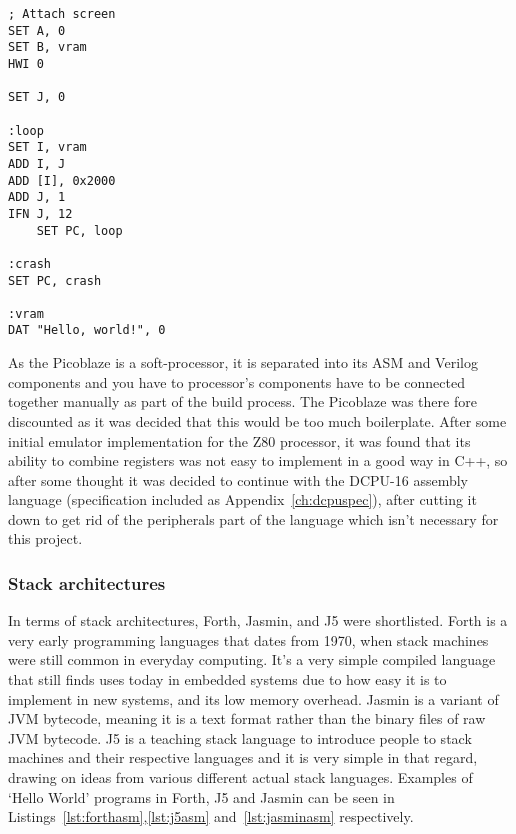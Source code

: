 \noindent\begin{minipage}{\linewidth} %
\begin{lstlisting}[caption={DCPU-16 ASM}, label={lst:dcpuasm}]
; Attach screen
SET A, 0
SET B, vram
HWI 0

SET J, 0

:loop
SET I, vram
ADD I, J
ADD [I], 0x2000
ADD J, 1
IFN J, 12
    SET PC, loop

:crash
SET PC, crash

:vram
DAT "Hello, world!", 0
\end{lstlisting}%
\end{minipage}

As the Picoblaze is a soft-processor, it is separated into its ASM and Verilog
components and you have to processor's components have to be connected together
manually as part of the build process. The Picoblaze was there fore discounted
as it was decided that this would be too much boilerplate.
After some initial emulator implementation for the
Z80 processor, it was found that its ability to combine registers was not easy
to implement in a good way in C++, so after some thought it was decided to
continue with the DCPU-16 assembly language (specification included as
Appendix~\ref{ch:dcpuspec}), after cutting it down to get rid of
the peripherals part of the language which isn't necessary for this project.

\subsubsection{Stack architectures}

In terms of stack architectures, Forth, Jasmin, and J5 were shortlisted. Forth
is a very early programming languages that dates from 1970, when stack machines
were still common in everyday computing. It's a very simple compiled language
that still finds uses today in embedded systems due to how easy it is to
implement in new systems, and its low memory overhead. Jasmin is a variant of
JVM bytecode, meaning it is a text format rather than the binary files of raw
JVM bytecode. J5 is a teaching stack language to introduce people to stack
machines and their respective languages and it is very simple in that regard,
drawing on ideas from various different actual stack languages. Examples of
`Hello World' programs in Forth, J5 and Jasmin can be seen in
Listings~\ref{lst:forthasm},\ref{lst:j5asm} and~\ref{lst:jasminasm}
respectively.

